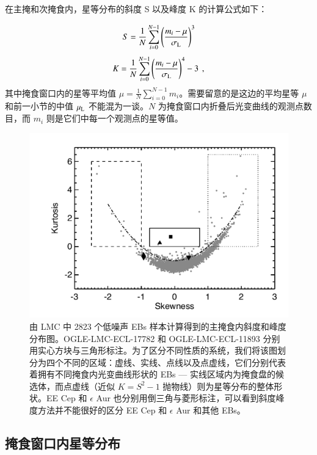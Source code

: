 在主掩和次掩食内，星等分布的斜度 S 以及峰度 K 的计算公式如下：

\begin{equation} \label{eq:skew}
S =  \frac{1}{N} \sum_{i=0}^{N-1} \left(\frac{m_i - \mu}{\sigma_\mathrm{L}}\right)^3 
\end{equation}  
\begin{equation} \label{eq:kur}
K =  \frac{1}{N} \sum_{i=0}^{N-1} \left(\frac{m_i - \mu}{\sigma_\mathrm{L}}\right)^4 - 3 \, \ , 
\end{equation} 
其中掩食窗口内的星等平均值 $\mu = \frac{1}{N} \sum_{i=0}^{N-1} m_i$。需要留意的是这边的平均星等 
$\mu$ 和前一小节的中值 $\mu_\mathrm{L}$ 不能混为一谈。$N$ 为掩食窗口内折叠后光变曲线的观测点数
目，而 $m_i$ 则是它们中每一个观测点的星等值。


\begin{figure}[t]
\centering
\includegraphics[width=1.0\textwidth,trim={0.4in 0.2in 0 0}]{figures/chapter3/f5_lmcks.pdf}
\caption{由 LMC 中 2823 个低噪声 EBs 样本计算得到的主掩食内斜度和峰度分布图。OGLE-LMC-ECL-17782 和 OGLE-LMC-ECL-11893 分别用实心方块与三角形标注。为了区分不同性质的系统，我们将该图划分为四个不同的区域：虚线、实线、点线以及点虚线，它们分别代表着拥有不同掩食内光变曲线形状的 EBs --- 实线区域内为掩食盘的候选体，而点虚线（近似 $K=S^2-1$ 抛物线）则为星等分布的整体形状。EE Cep 和 $\epsilon$ Aur 也分别用倒三角与菱形标注，可以看到斜度峰度方法并不能很好的区分 EE Cep 和 $\epsilon$ Aur 和其他 EBs。}
\label{fig:lmcks}
\end{figure}


\subsection{掩食窗口内星等分布} \label{sec:discebresult}

